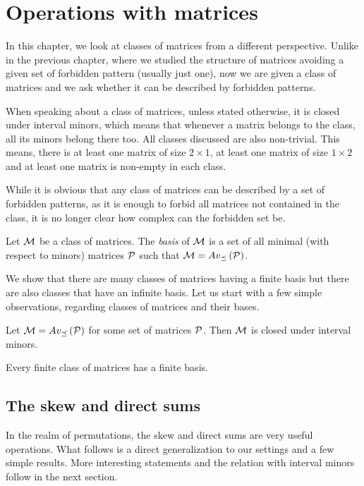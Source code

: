\chapter{Operations with matrices}
In this chapter, we look at classes of matrices from a different perspective. Unlike in the previous chapter, where we studied the structure of matrices avoiding a given set of forbidden pattern (usually just one), now we are given a class of matrices and we ask whether it can be described by forbidden patterns.

When speaking about a class of matrices, unless stated otherwise, it is closed under interval minors, which means that whenever a matrix belongs to the class, all its minors belong there too. All classes discussed are also non-trivial. This means, there is at least one matrix of size $2\times1$, at least one matrix of size $1\times2$ and at least one matrix is non-empty in each class.

While it is obvious that any class of matrices can be described by a set of forbidden patterns, as it is enough to forbid all matrices not contained in the class, it is no longer clear how complex can the forbidden set be.

\begin{defn}
Let $\mathcal{M}$ be a class of matrices. The \emph{basis} of $\mathcal{M}$ is a set of all minimal (with respect to minors) matrices $\mathcal{P}$ such that $\mathcal{M}=Av_{\preceq}\left(\mathcal{P}\right)$.
\end{defn}

We show that there are many classes of matrices having a finite basis but there are also classes that have an infinite basis. Let us start with a few simple observations, regarding classes of matrices and their bases. 

\begin{obs}
Let $\mathcal{M}=Av_{\preceq}\left(\mathcal{P}\right)$ for some set of matrices $\mathcal{P}$. Then $\mathcal{M}$ is closed under interval minors.
\end{obs}

\begin{obs}
Every finite class of matrices has a finite basis.
\end{obs}

\section{The skew and direct sums}
In the realm of permutations, the skew and direct sums are very useful operations. What follows is a direct generalization to our settings and a few simple results. More interesting statements and the relation with interval minors follow in the next section.

